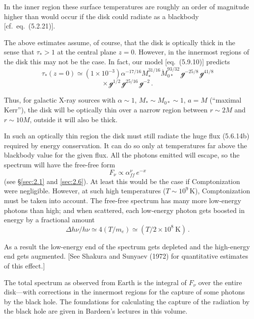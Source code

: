 In the inner region these surface temperatures are roughly an order of magnitude
higher than would occur if the disk could radiate as a blackbody [cf.\ eq.\
(5.2.21)].

The above estimates assume, of course, that the disk is optically thick in the
sense that $\tau_* > 1$ at the central plane $z = 0$.  However, in the innermost regions
of the disk this may not be the case.  In fact, our model [eq.\ (5.9.10)] predicts
%
\[
\tau_*(z = 0) \simeq (1 \times 10^{-3})\alpha^{-17/16}M_*^{31/16}\dot{M}_{0*}^{93/32}\,\mathscr{g}^{-25/8}\,\mathscr{g}^{41/8}
\]
%
\[
\times\,\mathscr{g}^{1/2}\,\mathscr{g}^{25/16}\,\mathscr{g}^{-2}\,.
\]

Thus, for galactic X-ray sources with $\alpha \sim 1$, $M_* \sim M_{0*} \sim 1$, $a = M$ (``maximal
Kerr''), the disk will be optically thin over a narrow region between $r \sim 2M$ and
$r \sim 10M$, outside it
will also be thick.

In such an optically thin region the disk must still radiate the huge flux
(5.6.14b) required by energy conservation.  It can do so only at temperatures far
above the blackbody value for the given flux.  All the photons emitted will
escape, so the spectrum will have the free-free form
%
\begin{equation}
\tag{5.10.9}
F_\nu \propto \alpha_{ff}^{\nu}\, e^{-x}
\end{equation}
%
(see \S\ref{sec:2.1} and \ref{sec:2.6}).  At least this would be the case if Comptonization were
negligible.  However, at such high temperatures ($T \sim 10^9$\,K), Comptonization
must be taken into account.  The free-free spectrum has many more low-energy
photons than high; and when scattered, each low-energy photon gets boosted
in energy by a fractional amount
%
\begin{equation}
\tag{5.10.10}
\Delta h\nu / h\nu \simeq 4(T/m_e) \simeq (T/2 \times 10^8~\text{K})\,.
\end{equation}

As a result the low-energy end of the spectrum gets depleted and the high-energy
end gets augmented.  [See Shakura and Sunyaev (1972) for quantitative estimates
of this effect.]

The total spectrum as observed from Earth is the integral of $F_\nu$ over the
entire disk---with corrections in the innermost regions for the capture of some
photons by the black hole.  The foundations for calculating the capture
of the radiation by the black hole are given in Bardeen's lectures in this volume.


